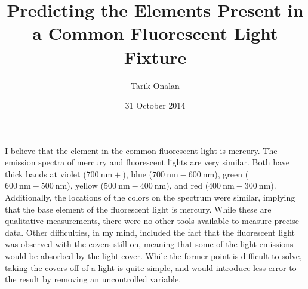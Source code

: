 \documentclass[a4paper]{article}
\title{Predicting the Elements Present in a Common Fluorescent Light Fixture}
\date{31 October 2014}
\author{Tarik Onalan}
\begin{document}
    \maketitle

    I believe that the element in the common fluorescent light is mercury. The emission
    spectra of mercury and fluorescent lights are very similar. Both have thick bands at violet
    (\(\SI{700}{\nm}+\)), blue (\(\SI{700}{\nm}-\SI{600}{\nm}\)), green (\(\SI{600}{\nm}-\SI{500}{\nm}\)),
    yellow (\(\SI{500}{\nm}-\SI{400}{\nm}\)), and red (\(\SI{400}{\nm}-\SI{300}{\nm}\)). Additionally,
    the locations of the colors on the spectrum were similar, implying that the base element of
    the fluorescent light is mercury. While these are qualitative measurements, there were no other
    tools available to measure precise data. Other difficulties, in my mind, included the fact
    that the fluorescent light was observed with the covers still on, meaning that some of the light
    emissions would be absorbed by the light cover. While the former point is difficult to solve,
    taking the covers off of a light is quite simple, and would introduce less error to the result
    by removing an uncontrolled variable.
\end{document}
